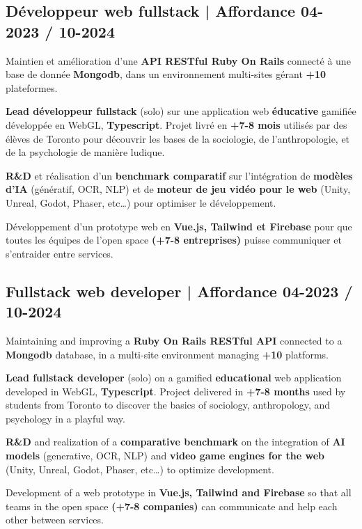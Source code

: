 {
\subsection{{Développeur web fullstack | Affordance \hfill 04-2023 / 10-2024}}
\begin{zitemize}
    \item Maintien et amélioration d’une \textbf{API RESTful Ruby On Rails} connecté à une base de donnée \textbf{Mongodb}, dans un environnement multi-sites gérant \textbf{+10} plateformes.
    \item \textbf{Lead développeur fullstack} (solo) sur une application web \textbf{éducative} gamifiée développée en WebGL, \textbf{Typescript}. Projet livré en \textbf{+7-8 mois} utilisés par des élèves de Toronto pour découvrir  les bases de la sociologie, de l’anthropologie, et de la psychologie de manière ludique.
    \item \textbf{R\&D} et réalisation d'un \textbf{benchmark comparatif} sur l’intégration de \textbf{modèles d’IA} (génératif, OCR, NLP) et de \textbf{moteur de jeu vidéo pour le web} (Unity, Unreal, Godot, Phaser, etc\ldots) pour optimiser le développement.
    \item Développement d’un prototype web en \textbf{Vue.js, Tailwind et Firebase} pour que toutes les équipes de l’open space \textbf{(+7-8 entreprises)} puisse communiquer et s’entraider entre services.
\end{zitemize}
}
{
\subsection{{Fullstack web developer | Affordance \hfill 04-2023 / 10-2024}}
\begin{zitemize}
    \item Maintaining and improving a \textbf{Ruby On Rails RESTful API} connected to a \textbf{Mongodb} database, in a multi-site environment managing \textbf{+10} platforms.
    \item \textbf{Lead fullstack developer} (solo) on a gamified \textbf{educational} web application developed in WebGL, \textbf{Typescript}. Project delivered in \textbf{+7-8 months} used by students from Toronto to discover the basics of sociology, anthropology, and psychology in a playful way.
    \item \textbf{R\&D} and realization of a \textbf{comparative benchmark} on the integration of \textbf{AI models} (generative, OCR, NLP) and \textbf{video game engines for the web} (Unity, Unreal, Godot, Phaser, etc\ldots) to optimize development.
    \item Development of a web prototype in \textbf{Vue.js, Tailwind and Firebase} so that all teams in the open space \textbf{(+7-8 companies)} can communicate and help each other between services.
\end{zitemize}
}
